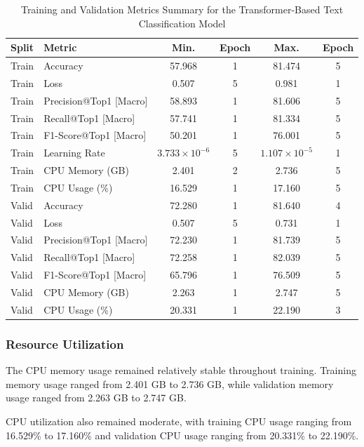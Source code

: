 \documentclass{ieeeaccess}
\begin{document}
\begin{table}[t!]
\centering
\caption{Training and Validation Metrics Summary for the Transformer-Based Text Classification Model}
\begin{tabular}{|l|l|c|c|c|c|}
\hline
\textbf{Split} & \textbf{Metric} & \textbf{Min.} & \textbf{Epoch} & \textbf{Max.} & \textbf{Epoch} \\
\hline
Train & Accuracy & 57.968 & 1 & 81.474 & 5 \\
Train & Loss & 0.507 & 5 & 0.981 & 1 \\
Train & Precision@Top1 [Macro] & 58.893 & 1 & 81.606 & 5 \\
Train & Recall@Top1 [Macro] & 57.741 & 1 & 81.334 & 5 \\
Train & F1-Score@Top1 [Macro] & 50.201 & 1 & 76.001 & 5 \\
Train & Learning Rate & $3.733 \times 10^{-6}$ & 5 & $1.107 \times 10^{-5}$ & 1 \\
Train & CPU Memory (GB) & 2.401 & 2 & 2.736 & 5 \\
Train & CPU Usage (\%) & 16.529 & 1 & 17.160 & 5 \\
\hline
Valid & Accuracy & 72.280 & 1 & 81.640 & 4 \\
Valid & Loss & 0.507 & 5 & 0.731 & 1 \\
Valid & Precision@Top1 [Macro] & 72.230 & 1 & 81.739 & 5 \\
Valid & Recall@Top1 [Macro] & 72.258 & 1 & 82.039 & 5 \\
Valid & F1-Score@Top1 [Macro] & 65.796 & 1 & 76.509 & 5 \\
Valid & CPU Memory (GB) & 2.263 & 1 & 2.747 & 5 \\
Valid & CPU Usage (\%) & 20.331 & 1 & 22.190 & 3 \\
\hline
\end{tabular}
\label{tab:transformer_text_classification_metrics}
\end{table}

\subsubsection{Resource Utilization}

The CPU memory usage remained relatively stable throughout training. Training memory usage ranged from 2.401 GB to 2.736 GB, while validation memory usage ranged from 2.263 GB to 2.747 GB.

CPU utilization also remained moderate, with training CPU usage ranging from 16.529\% to 17.160\% and validation CPU usage ranging from 20.331\% to 22.190\%.
\end{document}
